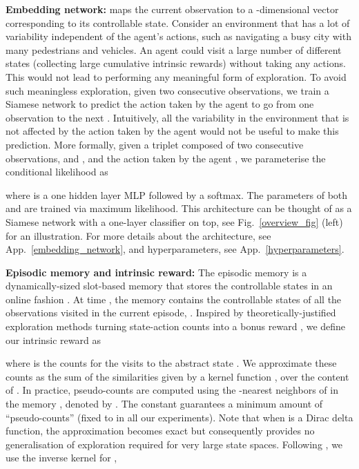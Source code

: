 \documentclass{article} \usepackage{iclr2020_conference,times}
\begin{document}
{\bf Embedding network:}
 maps the current observation to a -dimensional vector corresponding to its controllable state.
Consider an environment that has a lot of variability independent of the agent's actions, such as navigating a busy city with many pedestrians and vehicles. An agent could visit a large number of different states (collecting large cumulative intrinsic rewards) without taking any actions. This would not lead to performing any meaningful form of exploration. 
To avoid such meaningless exploration, given two consecutive observations, we train a Siamese network \citep{bromley1994signature,koch2015siamese}  to predict the action taken by the agent to go from one observation to the next \citep{pathak2017curiosity}. Intuitively, all the variability in the environment that is not affected by the action taken by the agent would not be useful to make this prediction.
More formally, given a triplet  composed of two consecutive observations,  and , and the action taken by the agent , we parameterise the conditional likelihood as 

where  is a one hidden layer MLP followed by a softmax. The parameters of both  and  are trained via maximum likelihood. This architecture can be thought of as a Siamese network with a one-layer classifier on top, see Fig.~\ref{overview_fig} (left) for an illustration. For more details about the architecture, see App.~\ref{embedding_network}, and hyperparameters, see App.~\ref{hyperparameters}.

{\bf Episodic memory and intrinsic reward:} The episodic memory  is a dynamically-sized slot-based memory that stores the controllable states in an online fashion \citep{pritzel2017neural}. 
At time , the memory contains the controllable states of all the observations visited in the current episode, .
Inspired by theoretically-justified exploration methods turning state-action counts into a bonus reward \citep{strehl2008analysis}, we define our intrinsic reward as

where  is the counts for the visits to the abstract state . We approximate these counts  as the sum of the similarities given by a kernel function , over the content of . In practice, pseudo-counts are computed using the -nearest neighbors of  in the memory , denoted by . The constant  guarantees a minimum amount of ``pseudo-counts'' (fixed to  in all our experiments). Note that when  is a Dirac delta function, the approximation becomes exact but consequently provides no generalisation of exploration required for very large state spaces. Following \citet{blundell2016model,pritzel2017neural}, we use the inverse kernel for ,
\end{document}
